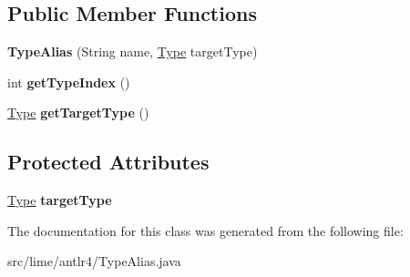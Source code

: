 \subsection*{Public Member Functions}
\begin{DoxyCompactItemize}
\item 
\mbox{\label{classlime_1_1antlr4_1_1TypeAlias_a193b5221ec172384f40e7b1f4cba3775}} 
{\bfseries Type\+Alias} (String name, \hyperlink{interfacelime_1_1antlr4_1_1Type}{Type} target\+Type)
\item 
\mbox{\label{classlime_1_1antlr4_1_1TypeAlias_a3da21d66b5b8b3e189bc73a18b6e0a02}} 
int {\bfseries get\+Type\+Index} ()
\item 
\mbox{\label{classlime_1_1antlr4_1_1TypeAlias_a462cc211280a35094a1caa4007c8463b}} 
\hyperlink{interfacelime_1_1antlr4_1_1Type}{Type} {\bfseries get\+Target\+Type} ()
\end{DoxyCompactItemize}
\subsection*{Protected Attributes}
\begin{DoxyCompactItemize}
\item 
\mbox{\label{classlime_1_1antlr4_1_1TypeAlias_acb00aa1ca81888ab838457ee9c1d144e}} 
\hyperlink{interfacelime_1_1antlr4_1_1Type}{Type} {\bfseries target\+Type}
\end{DoxyCompactItemize}


The documentation for this class was generated from the following file\+:\begin{DoxyCompactItemize}
\item 
src/lime/antlr4/Type\+Alias.\+java\end{DoxyCompactItemize}
